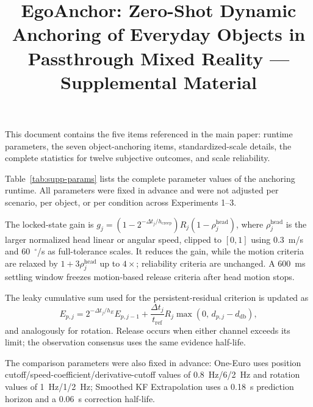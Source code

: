 \documentclass[review]{vgtc}
\title{EgoAnchor: Zero-Shot Dynamic Anchoring of Everyday Objects in Passthrough Mixed Reality --- Supplemental Material}
\author{}
\begin{document}
\maketitle
\label{sec:supp-params}

This document contains the five items referenced in the main paper: runtime
parameters, the seven object-anchoring items, standardized-scale details, the
complete statistics for twelve subjective outcomes, and scale reliability.

Table~\ref{tab:supp-params} lists the complete parameter values of the anchoring
runtime. All parameters were fixed in advance and were not adjusted per scenario,
per object, or per condition across Experiments 1--3.

The locked-state gain is
$g_j = (1 - 2^{-\Delta t_j / h_{\mathrm{creep}}}) R_j (1 - \rho_j^{\mathrm{head}})$,
where $\rho_j^{\mathrm{head}}$ is the larger normalized head linear or angular speed,
clipped to $[0,1]$ using 0.3~m/s and 60~$^\circ$/s as full-tolerance scales. It
reduces the gain, while the motion criteria are relaxed by $1+3\rho_j^{\mathrm{head}}$
up to $4\times$; reliability criteria are unchanged. A 600~ms settling window
freezes motion-based release criteria after head motion stops.

The leaky cumulative sum used for the persistent-residual criterion is updated as
\begin{equation}
E_{p,j} = 2^{-\Delta t_j / h_E} E_{p,j-1} + \frac{\Delta t_j}{t_{\mathrm{ref}}} R_j \max\!\left(0,\, d_{p,j} - d_{\mathrm{db}}\right),
\label{eq:supp-cusum}
\end{equation}
and analogously for rotation. Release occurs when either channel exceeds its limit;
the observation consensus uses the same evidence half-life.

The comparison parameters were also fixed in advance: One-Euro uses position
cutoff/speed-coefficient/derivative-cutoff values of 0.8~Hz/6/2~Hz and rotation
values of 1~Hz/1/2~Hz; Smoothed KF Extrapolation uses a 0.18~s prediction horizon
and a 0.06~s correction half-life.
\end{document}
